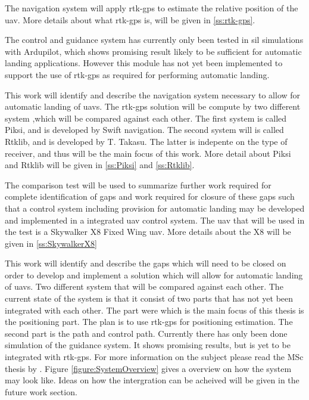 The navigation system will apply \gls{rtk-gps} to estimate the relative position of the \gls{uav}. More details about what \gls{rtk-gps} is, will be given in \ref{ss:rtk-gps}.

The control and guidance system has currently only been tested in \gls{sil} simulations with Ardupilot, which shows promising result likely to be sufficient for automatic landing applications. However this module has not yet been implemented to support the use of \gls{rtk-gps} as required for performing automatic landing.

This work will identify and describe the navigation system necessary to allow for automatic landing of \glspl{uav}. The \gls{rtk-gps} solution will be compute by two different system ,which will be compared against each other. The first system is called Piksi, and is developed by Swift navigation. The second system will is called Rtklib, and is developed by T. Takasu. The latter is indepente on the type of receiver, and thus will be the main focus of this work. More detail about Piksi and Rtklib will be given in \ref{ss:Piksi} and \ref{ss:Rtklib}.

The comparison test will be used to summarize further work required for complete identification of gaps and work required for closure of these gaps such that a control system including provision for automatic landing may be developed and implemented in a integrated \gls{uav} control system. The \gls{uav} that will be used in the test is a Skywalker X8 Fixed Wing \gls{uav}. More details about the X8 will be given in \ref{ss:SkywalkerX8}


This work will identify and describe the gaps which will need to be closed on order to develop and implement a solution which will allow for automatic landing of \glspl{uav}. Two different system that will be compared against each other. 
The current state of the system is that it consist of two parts that has not yet been integrated with each other. The part were which is the main focus of this thesis is the positioning part. The plan is to use \gls{rtk-gps} for positioning estimation. The second part is the path and control path. Currently there has only been done simulation of the guidance system. It shows promising results, but is yet to be integrated with \gls{rtk-gps}. For more information on the subject please read the MSc thesis by \citep{Froelich}. Figure \ref{figure:SystemOverview} gives a overview on how the system may look like. Ideas on how the intergration can be acheived will be given in the future work section. 



